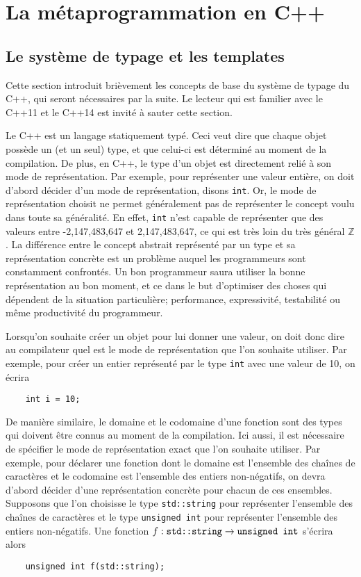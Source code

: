 \section{La métaprogrammation en C++}

\subsection{Le système de typage et les templates}
Cette section introduit brièvement les concepts de base du système de typage
du C++, qui seront nécessaires par la suite. Le lecteur qui est familier avec
le C++11 et le C++14 est invité à sauter cette section.

Le C++ est un langage statiquement typé. Ceci veut dire que chaque objet
possède un (et un seul) type, et que celui-ci est déterminé au moment de la
compilation. De plus, en C++, le type d'un objet est directement relié à son
mode de représentation. Par exemple, pour représenter une valeur entière, on
doit d'abord décider d'un mode de représentation, disons {\tt int}. Or, le mode
de représentation choisit ne permet généralement pas de représenter le concept
voulu dans toute sa généralité. En effet, {\tt int} n'est capable de représenter
que des valeurs entre -2,147,483,647 et 2,147,483,647, ce qui est très loin
du très général $\mathbb{Z}$. La différence entre le concept abstrait
représenté par un type et sa représentation concrète est un problème auquel
les programmeurs sont constamment confrontés. Un bon programmeur saura
utiliser la bonne représentation au bon moment, et ce dans le but d'optimiser
des choses qui dépendent de la situation particulière; performance,
expressivité, testabilité ou même productivité du programmeur.

Lorsqu'on souhaite créer un objet pour lui donner une valeur, on doit donc
dire au compilateur quel est le mode de représentation que l'on souhaite
utiliser. Par exemple, pour créer un entier représenté par le type {\tt int}
avec une valeur de 10, on écrira
\begin{verbatim}
    int i = 10;
\end{verbatim}

De manière similaire, le domaine et le codomaine d'une fonction sont des
types qui doivent être connus au moment de la compilation. Ici aussi, il
est nécessaire de spécifier le mode de représentation exact que l'on souhaite
utiliser. Par exemple, pour déclarer une fonction dont le domaine est
l'ensemble des chaînes de caractères et le codomaine est l'ensemble des
entiers non-négatifs, on devra d'abord décider d'une représentation concrète
pour chacun de ces ensembles. Supposons que l'on choisisse le type
{\tt std::string} pour représenter l'ensemble des chaînes de caractères et le
type {\tt unsigned int} pour représenter l'ensemble des entiers non-négatifs.
Une fonction $f : \text{{\tt std::string}} \to \text{{\tt unsigned int}}$
s'écrira alors
\begin{verbatim}
    unsigned int f(std::string);
\end{verbatim}

